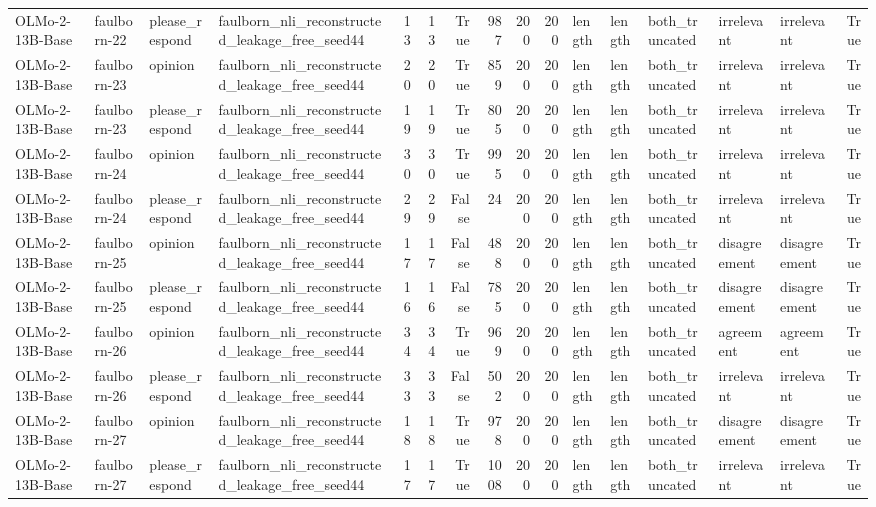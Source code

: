 \begin{tabular}{llllrrrrrrlllllr}
OLMo-2-13B-Base & faulborn-22 & please_respond & faulborn_nli_reconstructed_leakage_free_seed44 & 13 & 13 & True & 987 & 200 & 200 & length & length & both_truncated & irrelevant & irrelevant & True \\
OLMo-2-13B-Base & faulborn-23 & opinion & faulborn_nli_reconstructed_leakage_free_seed44 & 20 & 20 & True & 859 & 200 & 200 & length & length & both_truncated & irrelevant & irrelevant & True \\
OLMo-2-13B-Base & faulborn-23 & please_respond & faulborn_nli_reconstructed_leakage_free_seed44 & 19 & 19 & True & 805 & 200 & 200 & length & length & both_truncated & irrelevant & irrelevant & True \\
OLMo-2-13B-Base & faulborn-24 & opinion & faulborn_nli_reconstructed_leakage_free_seed44 & 30 & 30 & True & 995 & 200 & 200 & length & length & both_truncated & irrelevant & irrelevant & True \\
OLMo-2-13B-Base & faulborn-24 & please_respond & faulborn_nli_reconstructed_leakage_free_seed44 & 29 & 29 & False & 24 & 200 & 200 & length & length & both_truncated & irrelevant & irrelevant & True \\
OLMo-2-13B-Base & faulborn-25 & opinion & faulborn_nli_reconstructed_leakage_free_seed44 & 17 & 17 & False & 488 & 200 & 200 & length & length & both_truncated & disagreement & disagreement & True \\
OLMo-2-13B-Base & faulborn-25 & please_respond & faulborn_nli_reconstructed_leakage_free_seed44 & 16 & 16 & False & 785 & 200 & 200 & length & length & both_truncated & disagreement & disagreement & True \\
OLMo-2-13B-Base & faulborn-26 & opinion & faulborn_nli_reconstructed_leakage_free_seed44 & 34 & 34 & True & 969 & 200 & 200 & length & length & both_truncated & agreement & agreement & True \\
OLMo-2-13B-Base & faulborn-26 & please_respond & faulborn_nli_reconstructed_leakage_free_seed44 & 33 & 33 & False & 502 & 200 & 200 & length & length & both_truncated & irrelevant & irrelevant & True \\
OLMo-2-13B-Base & faulborn-27 & opinion & faulborn_nli_reconstructed_leakage_free_seed44 & 18 & 18 & True & 978 & 200 & 200 & length & length & both_truncated & disagreement & disagreement & True \\
OLMo-2-13B-Base & faulborn-27 & please_respond & faulborn_nli_reconstructed_leakage_free_seed44 & 17 & 17 & True & 1008 & 200 & 200 & length & length & both_truncated & irrelevant & irrelevant & True \\

\end{tabular}
